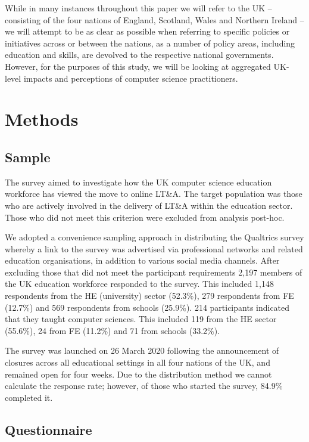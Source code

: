 \documentclass[sigconf]{acmart}
\begin{document}
While in many instances throughout this paper we will refer to the UK
-- consisting of the four nations of England, Scotland, Wales and
Northern Ireland -- we will attempt to be as clear as possible when
referring to specific policies or initiatives across or between the
nations, as a number of policy areas, including education and skills,
are devolved to the respective national governments. However, for the
purposes of this study, we will be looking at aggregated UK-level
impacts and perceptions of computer science practitioners.

\section{Methods}\label{methods}

\subsection{Sample}

The survey aimed to investigate how the UK computer science education
workforce has viewed the move to online LT\&A. The target population was
those who are actively involved in the delivery of LT\&A within the
education sector. Those who did not meet this criterion were excluded
from analysis post-hoc.

We adopted a convenience sampling approach in distributing the
Qualtrics survey whereby a link to the survey was advertised via
professional networks and related education organisations, in addition
to various social media channels. After excluding those that did not
meet the participant requirements 2,197 members of the UK education
workforce responded to the survey. This included 1,148 respondents
from the HE (university) sector (52.3\%), 279 respondents from FE
(12.7\%) and 569 respondents from schools (25.9\%). 214 participants
indicated that they taught computer sciences. This included 119 from
the HE sector (55.6\%), 24 from FE (11.2\%) and 71 from schools
(33.2\%).

The survey was launched on 26 March 2020 following the announcement of
closures across all educational settings in all four nations of the
UK, and remained open for four weeks. Due to the distribution method
we cannot calculate the response rate; however, of those who started
the survey, 84.9\% completed it.

\subsection{Questionnaire}
\end{document}
